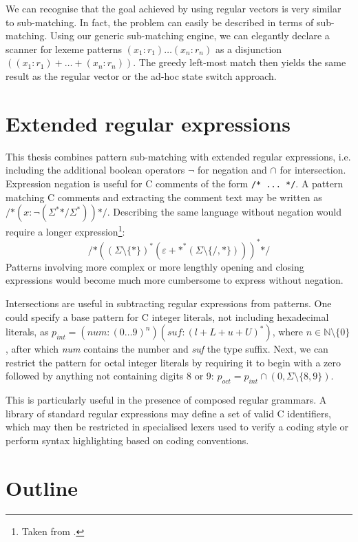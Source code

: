 We can recognise that the goal achieved by using regular vectors is very similar
to sub-matching. In fact, the problem can easily be described in terms of
sub-matching. Using our generic sub-matching engine, we can elegantly declare a
scanner for lexeme patterns $(x_1:r_1) \dots (x_n:r_n)$ as a disjunction
$((x_1:r_1) + \dots + (x_n:r_n))$. The greedy left-most match then yields the
same result as the regular vector or the ad-hoc state switch approach.


\section{Extended regular expressions}

This thesis combines pattern sub-matching with extended regular expressions,
i.e. including the additional boolean operators $\neg$ for negation and $\cap$
for intersection. Expression negation is useful for C comments of the form
\verb!/* ... */!. A pattern matching C comments and extracting the comment text
may be written as $\texttt{/*}(x:\neg(\Sigma^*\texttt{*/}\Sigma^*))\texttt{*/}$.
Describing the same language without negation would require a longer
expression\footnote{Taken from \cite{re-deriv}.}:
\[
  \texttt{/*}
  (
    (\Sigma \setminus \{*\})^*
    (\varepsilon + \texttt{*}^* (\Sigma \setminus \{\texttt{/}, \texttt{*}\}))
  )^*
  \texttt{*/}
\]
Patterns involving more complex or more lengthly opening and closing expressions
would become much more cumbersome to express without negation.

Intersections are useful in subtracting regular expressions from patterns. One
could specify a base pattern for C integer literals, not including hexadecimal
literals, as $p_{\mathit{int}} = (\mathit{num}:(0 \dots 9)^n)
(\mathit{suf}:(l+L+u+U)^*)$, where $n \in \mathbb{N} \setminus \{0\}$, after
which \textit{num} contains the number and \textit{suf} the type suffix. Next,
we can restrict the pattern for octal integer literals by requiring it to begin
with a zero followed by anything not containing digits 8 or 9: $p_{\mathit{oct}}
= p_{\mathit{int}} \cap (0, \Sigma \setminus \{8, 9\})$.

This is particularly useful in the presence of composed regular grammars. A
library of standard regular expressions may define a set of valid C identifiers,
which may then be restricted in specialised lexers used to verify a coding
style or perform syntax highlighting based on coding conventions.


\section{Outline}

